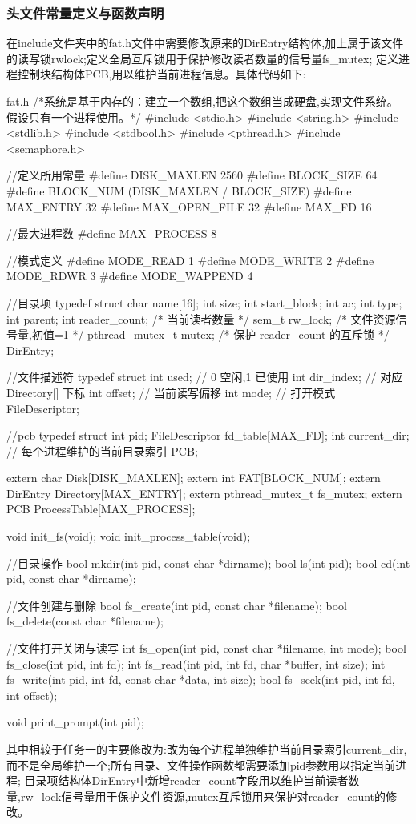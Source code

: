 \subsubsection{头文件常量定义与函数声明}
在include文件夹中的fat.h文件中需要修改原来的DirEntry结构体,加上属于该文件的读写锁rwlock;定义全局互斥锁用于保护修改读者数量的信号量fs\_mutex;
定义进程控制块结构体PCB,用以维护当前进程信息。具体代码如下:
\begin{ccode}{fat.h}
/*系统是基于内存的：建立一个数组,把这个数组当成硬盘,实现文件系统。
假设只有一个进程使用。*/
#include <stdio.h>
#include <string.h>
#include <stdlib.h>
#include <stdbool.h>
#include <pthread.h>
#include <semaphore.h>

//定义所用常量
#define DISK_MAXLEN 2560
#define BLOCK_SIZE 64
#define BLOCK_NUM (DISK_MAXLEN / BLOCK_SIZE)
#define MAX_ENTRY 32
#define MAX_OPEN_FILE 32
#define MAX_FD 16

//最大进程数
#define MAX_PROCESS 8

//模式定义
#define MODE_READ  1
#define MODE_WRITE 2
#define MODE_RDWR  3
#define MODE_WAPPEND 4

//目录项
typedef struct {
    char name[16];
    int size;
    int start_block;
    int ac;
    int type;
    int parent;
    int reader_count;           /* 当前读者数量 */
    sem_t rw_lock;              /* 文件资源信号量,初值=1 */
    pthread_mutex_t mutex;      /* 保护 reader_count 的互斥锁 */
} DirEntry;

//文件描述符
typedef struct {
    int used;       // 0 空闲,1 已使用
    int dir_index;  // 对应 Directory[] 下标
    int offset;     // 当前读写偏移
    int mode;       // 打开模式
} FileDescriptor;

//pcb
typedef struct {
    int pid;
    FileDescriptor fd_table[MAX_FD];
    int current_dir;          // 每个进程维护的当前目录索引
} PCB;


extern char Disk[DISK_MAXLEN];
extern int FAT[BLOCK_NUM];
extern DirEntry Directory[MAX_ENTRY];
extern pthread_mutex_t fs_mutex;
extern PCB ProcessTable[MAX_PROCESS];


void init_fs(void);
void init_process_table(void);

//目录操作
bool mkdir(int pid, const char *dirname);
bool ls(int pid);
bool cd(int pid, const char *dirname);

//文件创建与删除
bool fs_create(int pid, const char *filename);
bool fs_delete(const char *filename);

//文件打开关闭与读写
int  fs_open(int pid, const char *filename, int mode);
bool fs_close(int pid, int fd);
int  fs_read(int pid, int fd, char *buffer, int size);
int  fs_write(int pid, int fd, const char *data, int size);
bool fs_seek(int pid, int fd, int offset);


void print_prompt(int pid);

\end{ccode}
其中相较于任务一的主要修改为:改为每个进程单独维护当前目录索引current\_dir,而不是全局维护一个;所有目录、文件操作函数都需要添加pid参数用以指定当前进程;
目录项结构体DirEntry中新增reader\_count字段用以维护当前读者数量,rw\_lock信号量用于保护文件资源,mutex互斥锁用来保护对reader\_count的修改。